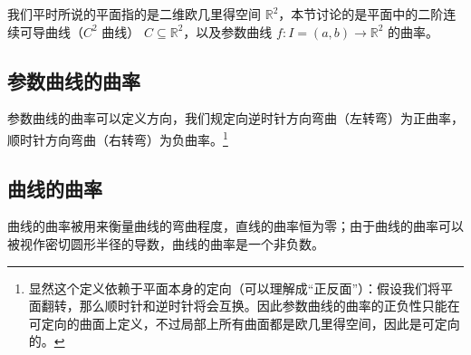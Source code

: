 
\begin{issues}
\issueDraft
\end{issues}


我们平时所说的平面指的是二维欧几里得空间 $\mathbb{R}^2$，本节讨论的是平面中的二阶连续可导曲线（$C^2$ 曲线） $C \subseteq \mathbb{R}^2$，以及参数曲线 $f: I = (a, b) \to \mathbb{R}^2$ 的曲率。

\subsection{参数曲线的曲率}

参数曲线的曲率可以定义方向，我们规定向逆时针方向弯曲（左转弯）为正曲率，顺时针方向弯曲（右转弯）为负曲率。\footnote{显然这个定义依赖于平面本身的定向（可以理解成“正反面”）：假设我们将平面翻转，那么顺时针和逆时针将会互换。因此参数曲线的曲率的正负性只能在可定向的曲面上定义，不过局部上所有曲面都是欧几里得空间，因此是可定向的。}

\subsection{曲线的曲率}

曲线的曲率被用来衡量曲线的弯曲程度，直线的曲率恒为零；由于曲线的曲率可以被视作密切圆形半径的导数，曲线的曲率是一个非负数。
